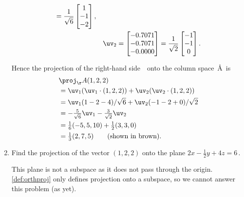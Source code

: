 \begin{example}
\begin{enumerate}[ref=\ref{eg:orthproj}(\alph*)]
\begin{solution}
\begin{figbox}{}
\begin{eqnarray*}
=\frac1{\sqrt6}\begin{bmatrix} 1\\-1\\-2 \end{bmatrix},
\\&&\uv_2=\begin{bmatrix} -0.7071\\-0.7071\\-0.0000 \end{bmatrix}
=\frac1{\sqrt2}\begin{bmatrix} -1\\-1\\0 \end{bmatrix}.
\end{eqnarray*}
\end{figbox}

\begin{figbox}{}%
Hence the projection of the right-hand side~\bv\ onto the column space~\AA\ is
\begin{align*}
&\proj_\AA(1,2,2)
\\&=\uv_1(\uv_1\cdot(1,2,2))+\uv_2(\uv_2\cdot(1,2,2))
\\&=\uv_1(1-2-4)/\sqrt6
+\uv_2(-1-2+0)/\sqrt2
\\&=-\tfrac5{\sqrt6}\uv_1-\tfrac3{\sqrt2}\uv_2
\\&=\tfrac16(-5,5,10)+\tfrac12(3,3,0)
\\&=\tfrac13(2,7,5) 
\qquad(\text{shown in brown}).
\end{align*}%
\end{figbox}

\end{solution}


\item Find the projection of the vector \((1,2,2)\) onto the plane \(2x-\frac12y+4z=6\)\,.
\begin{solution} 
This plane is not a subspace as it does not pass through the origin.
\cref{def:orthproj} only defines projection onto a subspace, so we cannot answer this problem (as yet). 
\end{solution}


\end{enumerate}
\end{example}
